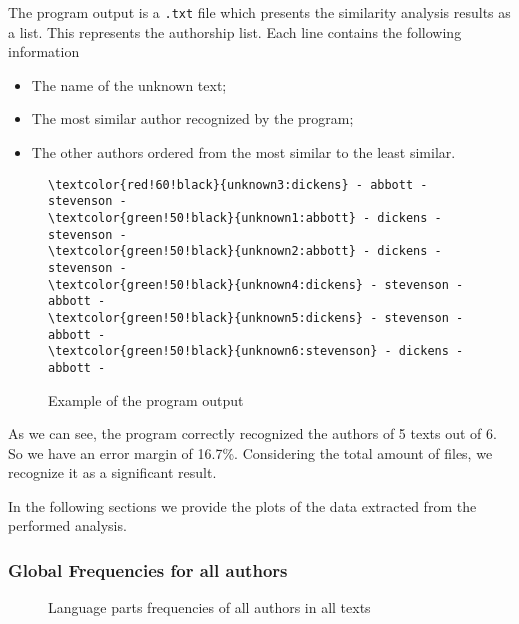 \documentclass[a4paper,11pt, twoside]{article}
\begin{document}
	The program output is a \texttt{.txt} file which presents the similarity analysis results as a list. This represents the authorship list. Each line contains the following information
	\begin{itemize}
		\item The name of the unknown text;
		\item The most similar author recognized by the program;
		\item The other authors ordered from the most similar to the least similar.
	\end{itemize}

	\begin{figure}[h!]
		\centering
		\begin{BVerbatim}[commandchars=\\\{\}]
\textcolor{red!60!black}{unknown3:dickens} - abbott - stevenson -
\textcolor{green!50!black}{unknown1:abbott} - dickens - stevenson -
\textcolor{green!50!black}{unknown2:abbott} - dickens - stevenson -
\textcolor{green!50!black}{unknown4:dickens} - stevenson - abbott -
\textcolor{green!50!black}{unknown5:dickens} - stevenson - abbott -
\textcolor{green!50!black}{unknown6:stevenson} - dickens - abbott -
	\end{BVerbatim}
	\caption{Example of the program output}
	\label{fig:output}
\end{figure}
	\noindent
	As we can see, the program correctly recognized the authors of 5 texts out of 6. So we have an error margin of 16.7\%. Considering the total amount of files, we recognize it as a significant result. 
	
	\noindent
	In the following sections we provide the plots of the data extracted from the performed analysis.

	\subsubsection{Global Frequencies for all authors}

	\begin{figure}[h!]
		\centering
		\caption{Language parts frequencies of all authors in all texts}
		\label{tikz:frequencies}
	\end{figure}
\end{document}
